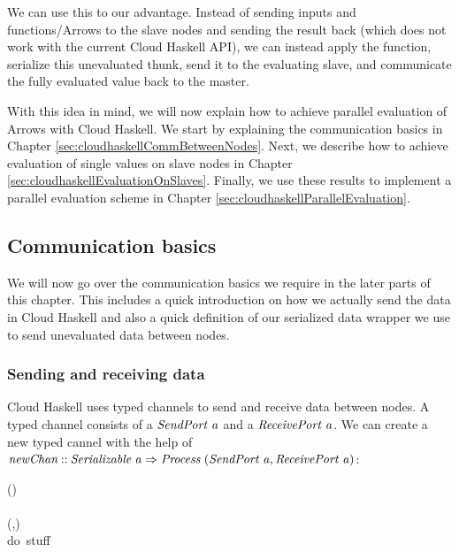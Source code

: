 \documentclass[paper=A4,twoside=true,openright,parskip=full,chapterprefix=true,headings=normal,bibliography=totoc,listof=totoc,titlepage=on,captions=tableabove,draft=false,british]{scrreprt}%
\begin{document}
We can use this to our advantage. Instead of sending inputs and
functions/Arrows to the slave nodes and sending the result back (which
does not work with the current Cloud Haskell API), we can instead apply
the function, serialize this unevaluated thunk, send it to the
evaluating slave, and communicate the fully evaluated value back to the
master.

With this idea in mind, we will now explain how to achieve parallel
evaluation of Arrows with Cloud Haskell. We start by explaining the
communication basics in Chapter \ref{sec:cloudhaskellCommBetweenNodes}.
Next, we describe how to achieve evaluation of single values on slave
nodes in Chapter \ref{sec:cloudhaskellEvaluationOnSlaves}. Finally, we
use these results to implement a parallel evaluation scheme in Chapter
\ref{sec:cloudhaskellParallelEvaluation}.

\hypertarget{communication-basics}{%
\subsection{Communication basics}\label{communication-basics}}

We will now go over the communication basics we require in the later
parts of this chapter. This includes a quick introduction on how we
actually send the data in Cloud Haskell and also a quick definition of
our serialized data wrapper we use to send unevaluated data between
nodes.

\label{sec:cloudhaskellCommBetweenNodes}

\hypertarget{sending-and-receiving-data}{%
\subsubsection{Sending and receiving
data}\label{sending-and-receiving-data}}

\label{sec:sendRecCloud}

Cloud Haskell uses typed channels to send and receive data between
nodes. A typed channel consists of a \ensuremath{\Conid{SendPort}\;\Varid{a}} and a \ensuremath{\Conid{ReceivePort}\;\Varid{a}}.
We can create a new typed cannel with the help of
\ensuremath{\Varid{newChan}\mathbin{::}\Conid{Serializable}\;\Varid{a}\Rightarrow \Conid{Process}\;(\Conid{SendPort}\;\Varid{a}, \linebreak \Conid{ReceivePort}\;\Varid{a})}:


\begin{hscode}\SaveRestoreHook
{}%
%
%
\>[B]{}\mathbin{::}\;(){}\<[E]%
\\
\>[B]{}\mathrel{=}\<[E]%
\\
\>[B]{}\<[5]%
\>[5]{}(,)\leftarrow {}\<[E]%
\\[\blanklineskip]%
\>[B]{}\<[5]%
\>[5]{}\mbox{\onelinecomment  do stuff}{}\<[E]%
\ColumnHook
\end{hscode}\resethooks
\vspace{-2\baselineskip}
\end{document}
